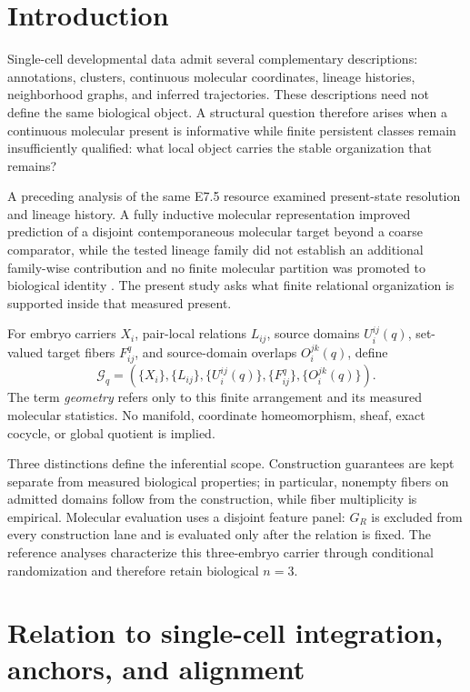\documentclass[11pt]{article}
\newcommand{\Grel}{\mathcal G_q}
\begin{document}
\FloatBarrier
\section{Introduction}

Single-cell developmental data admit several complementary descriptions: annotations, clusters, continuous molecular coordinates, lineage histories, neighborhood graphs, and inferred trajectories. These descriptions need not define the same biological object. A structural question therefore arises when a continuous molecular present is informative while finite persistent classes remain insufficiently qualified: what local object carries the stable organization that remains?

A preceding analysis of the same E7.5 resource examined present-state resolution and lineage history. A fully inductive molecular representation improved prediction of a disjoint contemporaneous molecular target beyond a coarse comparator, while the tested lineage family did not establish an additional family-wise contribution and no finite molecular partition was promoted to biological identity \cite{James2026P2}. The present study asks what finite relational organization is supported inside that measured present.

For embryo carriers \(X_i\), pair-local relations \(L_{ij}\), source domains \(U_i^{ij}(q)\), set-valued target fibers \(F_{ij}^{q}\), and source-domain overlaps \(O_i^{jk}(q)\), define
\begin{equation}
\boxed{
\Grel=
\left(
\{X_i\},
\{L_{ij}\},
\{U_i^{ij}(q)\},
\{F_{ij}^{q}\},
\{O_i^{jk}(q)\}
\right).
}
\label{eq:Gq}
\end{equation}
The term \emph{geometry} refers only to this finite arrangement and its measured molecular statistics. No manifold, coordinate homeomorphism, sheaf, exact cocycle, or global quotient is implied.

Three distinctions define the inferential scope. Construction guarantees are kept separate from measured biological properties; in particular, nonempty fibers on admitted domains follow from the construction, while fiber multiplicity is empirical. Molecular evaluation uses a disjoint feature panel: \(G_R\) is excluded from every construction lane and is evaluated only after the relation is fixed. The reference analyses characterize this three-embryo carrier through conditional randomization and therefore retain biological \(n=3\).

\FloatBarrier
\section{Relation to single-cell integration, anchors, and alignment}
\end{document}
